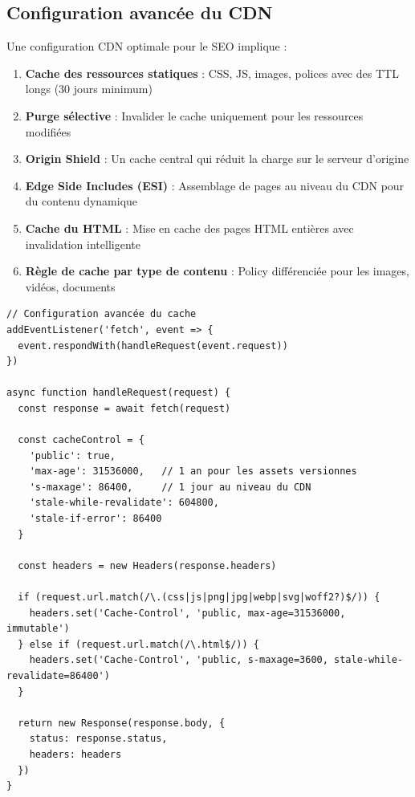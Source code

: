 \subsection{Configuration avancée du CDN}

Une configuration CDN optimale pour le SEO implique :

\begin{enumerate}
    \item \textbf{Cache des ressources statiques} : CSS, JS, images, polices avec des TTL longs (30 jours minimum)
    \item \textbf{Purge sélective} : Invalider le cache uniquement pour les ressources modifiées
    \item \textbf{Origin Shield} : Un cache central qui réduit la charge sur le serveur d'origine
    \item \textbf{Edge Side Includes (ESI)} : Assemblage de pages au niveau du CDN pour du contenu dynamique
    \item \textbf{Cache du HTML} : Mise en cache des pages HTML entières avec invalidation intelligente
    \item \textbf{Règle de cache par type de contenu} : Policy différenciée pour les images, vidéos, documents
\end{enumerate}

\begin{lstlisting}[style=code,caption={Exemple de configuration des en-têtes de cache avec Cloudflare Workers}]
// Configuration avancée du cache
addEventListener('fetch', event => {
  event.respondWith(handleRequest(event.request))
})

async function handleRequest(request) {
  const response = await fetch(request)

  const cacheControl = {
    'public': true,
    'max-age': 31536000,   // 1 an pour les assets versionnes
    's-maxage': 86400,     // 1 jour au niveau du CDN
    'stale-while-revalidate': 604800,
    'stale-if-error': 86400
  }

  const headers = new Headers(response.headers)

  if (request.url.match(/\.(css|js|png|jpg|webp|svg|woff2?)$/)) {
    headers.set('Cache-Control', 'public, max-age=31536000, immutable')
  } else if (request.url.match(/\.html$/)) {
    headers.set('Cache-Control', 'public, s-maxage=3600, stale-while-revalidate=86400')
  }

  return new Response(response.body, {
    status: response.status,
    headers: headers
  })
}
\end{lstlisting}

